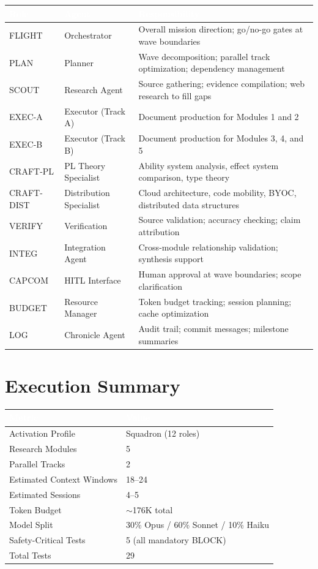 \documentclass[11pt,letterpaper]{article}
\newcommand{\tableheader}[1]{\textbf{\sffamily\textcolor{white}{#1}}}
\begin{document}
\begin{center}
\begin{tabularx}{\textwidth}{L{2cm}L{2.5cm}X}
\toprule
{}
\tableheader{Role} & \tableheader{Agent} & \tableheader{Responsibility} \\
\midrule
FLIGHT & Orchestrator & Overall mission direction; go/no-go gates at wave boundaries \\
PLAN & Planner & Wave decomposition; parallel track optimization; dependency management \\
SCOUT & Research Agent & Source gathering; evidence compilation; web research to fill gaps \\
EXEC-A & Executor (Track A) & Document production for Modules 1 and 2 \\
EXEC-B & Executor (Track B) & Document production for Modules 3, 4, and 5 \\
CRAFT-PL & PL Theory Specialist & Ability system analysis, effect system comparison, type theory \\
CRAFT-DIST & Distribution Specialist & Cloud architecture, code mobility, BYOC, distributed data structures \\
VERIFY & Verification & Source validation; accuracy checking; claim attribution \\
INTEG & Integration Agent & Cross-module relationship validation; synthesis support \\
CAPCOM & HITL Interface & Human approval at wave boundaries; scope clarification \\
BUDGET & Resource Manager & Token budget tracking; session planning; cache optimization \\
LOG & Chronicle Agent & Audit trail; commit messages; milestone summaries \\
\bottomrule
\end{tabularx}
\end{center}

\section{Execution Summary}

\begin{center}
\begin{tabularx}{\textwidth}{L{5cm}X}
\toprule
{}
\tableheader{Metric} & \tableheader{Value} \\
\midrule
Activation Profile & Squadron (12 roles) \\
Research Modules & 5 \\
Parallel Tracks & 2 \\
Estimated Context Windows & 18--24 \\
Estimated Sessions & 4--5 \\
Token Budget & $\sim$176K total \\
Model Split & 30\% Opus / 60\% Sonnet / 10\% Haiku \\
Safety-Critical Tests & 5 (all mandatory BLOCK) \\
Total Tests & 29 \\
\bottomrule
\end{tabularx}
\end{center}
\end{document}
